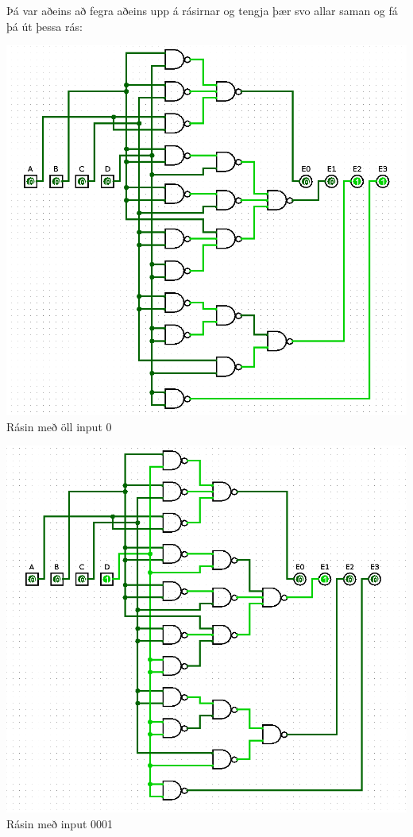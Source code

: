 \documentclass{article}
\begin{document}
Þá var aðeins að fegra aðeins upp á rásirnar og tengja þær svo allar saman og fá þá út þessa rás:
\begin{center}
    \includegraphics[scale=0.35]{heil.png}
    Rásin með öll input 0

    \includegraphics[scale=0.35]{heil2.png}
    Rásin með input 0001


\end{center}
\end{document}
